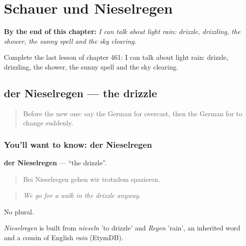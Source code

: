 
\chapter{Schauer und Nieselregen}
\label{ch:ge-schauer-und-nieselregen}

\begin{chapteropening}
\textbf{By the end of this chapter:} \emph{I can talk about light rain: drizzle, drizzling, the shower, the sunny spell and the sky clearing.}

Complete the last lesson of chapter 461: I can talk about light rain: drizzle, drizzling, the shower, the sunny spell and the sky clearing.
\end{chapteropening}

\section[der Nieselregen]{der Nieselregen — the drizzle}

\label{lesson:GE-C461-nieselregen}



\begin{quote}
Before the new one: say the German for overcast, then the German for to change suddenly.
\end{quote}

\subsection*{You'll want to know: der Nieselregen}
\textbf{der Nieselregen} — \textquotedblleft{}the drizzle\textquotedblright{}.

\begin{quote}
Bei Nieselregen gehen wir trotzdem spazieren.
\end{quote}

\begin{quote}
\emph{We go for a walk in the drizzle anyway.}
\end{quote}

No plural.

\begin{cousinweb}
\emph{Nieselregen} is built from \emph{nieseln} 'to drizzle' and \emph{Regen} 'rain', an inherited word and a cousin of English \emph{rain} (EtymDB).
\end{cousinweb}

